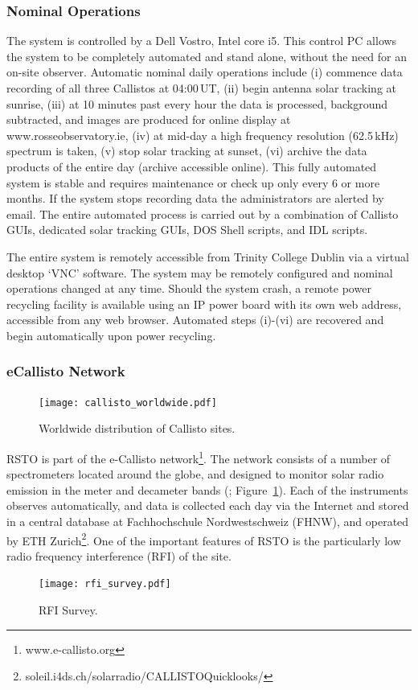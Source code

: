 \subsubsection{Nominal Operations}

The system is controlled by a Dell Vostro, Intel core i5. This control PC allows the system to be completely automated and stand alone, without the need for an on-site observer. Automatic nominal daily operations include (i) commence data recording of all three Callistos at 04:00\,UT, (ii) begin antenna solar tracking at sunrise, (iii) at 10 minutes past every hour the data is processed, background subtracted, and images are produced for online display at www.rosseobservatory.ie, (iv) at mid-day a high frequency resolution (62.5\,kHz) spectrum is taken, (v) stop solar tracking at sunset, (vi) archive the data products of the entire day (archive accessible online). This fully automated system is stable and requires maintenance or check up only every 6 or more months. If the system stops recording data the administrators are alerted by email. The entire automated process is carried out by a combination of Callisto GUIs, dedicated solar tracking GUIs, DOS Shell scripts, and IDL scripts.

The entire system is remotely accessible from Trinity College Dublin via a virtual desktop `VNC' software. The system may be remotely configured and nominal operations changed at any time. Should the system crash, a remote power recycling facility is available using an IP power board with its own web address, accessible from any web browser. Automated steps (i)-(vi) are recovered and begin automatically upon power recycling.

\subsubsection{eCallisto Network}
\begin{figure}[!t]
\begin{center}
\texttt{[image: callisto\_worldwide.pdf]}
\caption[Callisto Worlwide]{Worldwide distribution of Callisto sites.}
\label{fig:callisto_worldwide}
\end{center}
\end{figure}
RSTO is part of the e-Callisto network\footnote{www.e-callisto.org}. The network consists of a number of spectrometers located around the globe, and designed to monitor solar radio emission in the meter and decameter bands (\citealt{Benz2009}; Figure~\ref{fig:callisto_worldwide}).  Each of the instruments observes automatically, and data is collected each day via the Internet and stored in a central database at Fachhochschule Nordwestschweiz (FHNW), and operated by ETH Zurich\footnote{soleil.i4ds.ch/solarradio/CALLISTOQuicklooks/}. One of the important features of RSTO is the particularly low radio frequency interference (RFI) of the site. 
\begin{figure}[!t]
\begin{center}
\texttt{[image: rfi\_survey.pdf]}
\caption[RSTO RFI Survey]{RFI Survey.}
\label{fig:rfi_survey}
\end{center}
\end{figure}

